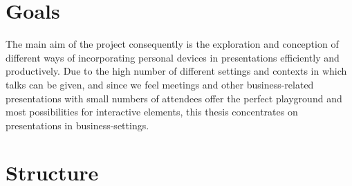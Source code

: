 \section{Goals}

The main aim of the project consequently is the exploration and conception of different ways of incorporating personal devices in presentations efficiently and productively. Due to the high number of different settings and contexts in which talks can be given, and since we feel meetings and other business-related presentations with small numbers of attendees offer the perfect playground and most possibilities for interactive elements, this thesis concentrates on presentations in business-settings.




\section{Structure}
